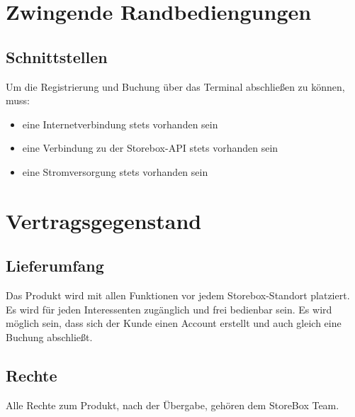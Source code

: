 
\section{Zwingende Randbediengungen}
\subsection{Schnittstellen}
Um die Registrierung und Buchung über das Terminal abschließen zu können, muss:
\begin{itemize}
 \item eine Internetverbindung stets vorhanden sein
 \item eine Verbindung zu der Storebox-API stets vorhanden sein
 \item eine Stromversorgung stets vorhanden sein
 \end{itemize}
\section{Vertragsgegenstand}
\subsection{Lieferumfang}
Das Produkt wird mit allen Funktionen vor jedem Storebox-Standort platziert. Es wird für jeden Interessenten zugänglich und frei bedienbar sein. Es wird möglich sein, dass sich der Kunde einen Account erstellt und auch gleich eine Buchung abschließt.

\subsection{Rechte}
Alle Rechte zum Produkt, nach der Übergabe, gehören dem StoreBox Team.